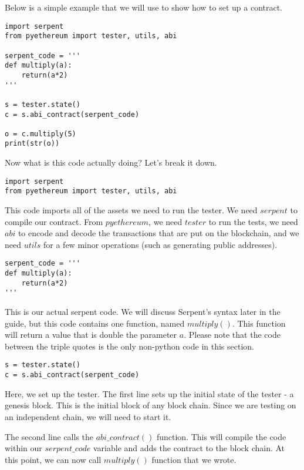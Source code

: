 \documentclass[12pt]{article}
\begin{document}
Below is a simple example that we will use to show how to set up a contract. \cite{test_contracts.py,Usingpyethereum.tester}

\begin{mdframed}
\begin{verbatim}
import serpent
from pyethereum import tester, utils, abi

serpent_code = '''
def multiply(a):
	return(a*2)
'''

s = tester.state()
c = s.abi_contract(serpent_code)

o = c.multiply(5)
print(str(o))
\end{verbatim}
\end{mdframed}

Now what is this code actually doing? Let's break it down.

\begin{verbatim}
import serpent
from pyethereum import tester, utils, abi
\end{verbatim}

This code imports all of the assets we need to run the tester. We need $serpent$ to compile our contract. From $pyethereum$, we need $tester$ to run the tests, we need $abi$ to encode and decode the transactions that are put on the blockchain, and we need $utils$ for a few minor operations (such as generating public addresses).

\begin{verbatim}
serpent_code = '''
def multiply(a):
	return(a*2)
'''
\end{verbatim}

This is our actual serpent code. We will discuss Serpent's syntax later in the guide, but this code contains one function, named $multiply()$. This function will return a value that is double the parameter $a$. Please note that the code between the triple quotes is the only non-python code in this section.

\begin{verbatim}
s = tester.state()
c = s.abi_contract(serpent_code)
\end{verbatim}
Here, we set up the tester. The first line sets up the initial state of the tester - a genesis block. This is the initial block of any block chain. Since we are testing on an independent chain, we will need to start it. 

The second line calls the $abi\_contract()$ function. This will compile the code within our $serpent\_code$ variable and adds the contract to the block chain. At this point, we can now call $multiply()$ function that we wrote. 
\end{document}
